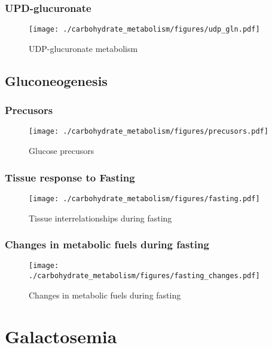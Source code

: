 \documentclass{scrartcl}
\begin{document}
\subsubsection{UPD-glucuronate}
\label{sec:org0dbbbca}

\begin{figure}[htbp]
\centering
\texttt{[image: ./carbohydrate\_metabolism/figures/udp\_gln.pdf]}
\caption{\label{fig:orgba05972}
UDP-glucuronate metabolism}
\end{figure}

\subsection{Gluconeogenesis}
\label{sec:org339d111}

\subsubsection{Precusors}
\label{sec:orgfc8fa81}

\begin{figure}[htbp]
\centering
\texttt{[image: ./carbohydrate\_metabolism/figures/precusors.pdf]}
\caption{\label{fig:org1bb1ec4}
Glucose precusors}
\end{figure}


\subsubsection{Tissue response to Fasting}
\label{sec:org5bddac4}

\begin{figure}[htbp]
\centering
\texttt{[image: ./carbohydrate\_metabolism/figures/fasting.pdf]}
\caption{\label{fig:orge844074}
Tissue interrelationships during fasting}
\end{figure}


\subsubsection{Changes in metabolic fuels during fasting}
\label{sec:org7d6415c}

\begin{figure}[htbp]
\centering
\texttt{[image: ./carbohydrate\_metabolism/figures/fasting\_changes.pdf]}
\caption{\label{fig:orgf8d21b8}
Changes in metabolic fuels during fasting}
\end{figure}

\section{Galactosemia}
\label{sec:orgfb14e9b}
\end{document}
